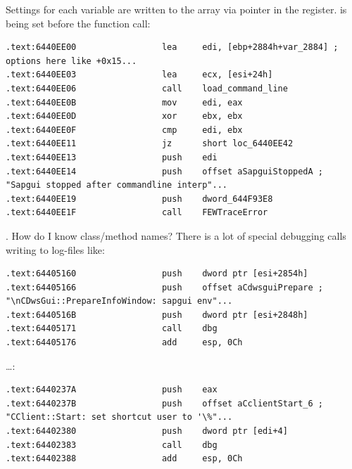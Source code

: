 {Settings for each variable are written to the array via pointer in the \EDI register.
\EDI is being set before the function call}:

\begin{lstlisting}
.text:6440EE00                 lea     edi, [ebp+2884h+var_2884] ; options here like +0x15...
.text:6440EE03                 lea     ecx, [esi+24h]
.text:6440EE06                 call    load_command_line
.text:6440EE0B                 mov     edi, eax
.text:6440EE0D                 xor     ebx, ebx
.text:6440EE0F                 cmp     edi, ebx
.text:6440EE11                 jz      short loc_6440EE42
.text:6440EE13                 push    edi
.text:6440EE14                 push    offset aSapguiStoppedA ; "Sapgui stopped after commandline interp"...
.text:6440EE19                 push    dword_644F93E8
.text:6440EE1F                 call    FEWTraceError
\end{lstlisting}

 .
{How do I know class/method names? There is a lot of special debugging calls writing to log-files like}:

\begin{lstlisting}
.text:64405160                 push    dword ptr [esi+2854h]
.text:64405166                 push    offset aCdwsguiPrepare ; "\nCDwsGui::PrepareInfoWindow: sapgui env"...
.text:6440516B                 push    dword ptr [esi+2848h]
.text:64405171                 call    dbg
.text:64405176                 add     esp, 0Ch
\end{lstlisting}

\dots \OrENRU:

\begin{lstlisting}
.text:6440237A                 push    eax
.text:6440237B                 push    offset aCclientStart_6 ; "CClient::Start: set shortcut user to '\%"...
.text:64402380                 push    dword ptr [edi+4]
.text:64402383                 call    dbg
.text:64402388                 add     esp, 0Ch
\end{lstlisting}

